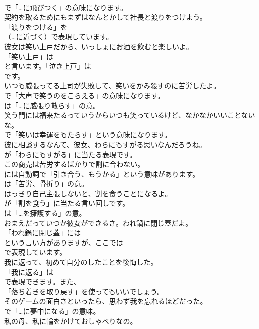 \documentclass[8pt]{extreport}
\begin{document}
\begin{CJK}{UTF8}{min}
\\	で「…に飛びつく」の意味になります。	
\\	契約を取るためにもまずはなんとかして社長と渡りをつけよう。 
\\	「渡りをつける」を 
\\	（…に近づく）で表現しています。	
\\	彼女は笑い上戸だから、いっしょにお酒を飲むと楽しいよ。 
\\	「笑い上戸」は 
\\	と言います。「泣き上戸」は 
\\	です。	
\\	いつも威張ってる上司が失敗して、笑いをかみ殺すのに苦労したよ。 
\\	で「大声で笑うのをこらえる」の意味になります。
\\	は「…に威張り散らす」の意。	
\\	笑う門には福来たるっていうからいつも笑っているけど、なかなかいいことないな。 
\\	で「笑いは幸運をもたらす」という意味になります。	
\\	彼に相談するなんて、彼女、わらにもすがる思いなんだろうね。 
\\	が「わらにもすがる」に当たる表現です。	
\\	この商売は苦労するばかりで割に合わない。 
\\	には自動詞で「引き合う、もうかる」という意味があります。
\\	は「苦労、骨折り」の意。	
\\	はっきり自己主張しないと、割を食うことになるよ。 
\\	が「割を食う」に当たる言い回しです。
\\	は「…を擁護する」の意。	
\\	おまえだっていつか彼女ができるさ。われ鍋に閉じ蓋だよ。 
\\	「われ鍋に閉じ蓋」には 
\\	という言い方がありますが、ここでは 
\\	で表現しています。	
\\	我に返って、初めて自分のしたことを後悔した。 
\\	「我に返る」は 
\\	で表現できます。また、
\\	「落ち着きを取り戻す」を使ってもいいでしょう。	
\\	そのゲームの面白さといったら、思わず我を忘れるほどだった。 
\\	で「…に夢中になる」の意味。	
\\	私の母、私に輪をかけておしゃべりなの。 

\end{CJK}
\end{document}
